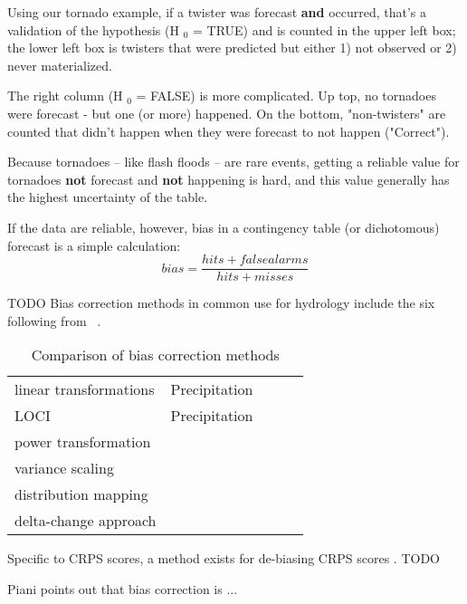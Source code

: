 Using our tornado example, if a twister was forecast \textbf{and} occurred, that's a validation of the hypothesis (H $_{\text{0}}$ = TRUE) and is counted in the upper left box; the lower left box is twisters that were predicted but either 1) not observed or 2) never materialized.

The right column (H $_{\text{0}}$ = FALSE) is more complicated. Up top, no tornadoes were forecast - but one (or more) happened. On the bottom, "non-twisters" are counted that didn't happen when they were forecast to not happen ("Correct"). 

Because tornadoes -- like flash floods -- are rare events, getting a reliable value for tornadoes \textbf{not} forecast and\textbf{ not} happening is hard, and this value generally has the highest uncertainty of the table.

If the data are reliable, however, bias in a contingency table (or dichotomous) forecast is a simple calculation:
\begin{equation}\label{BiasEquation}
bias =  \frac{ hits + false alarms }{ hits + misses }
\end{equation}


TODO
Bias correction methods in common use for hydrology include the six following from  ~\autocite{teutschbein2013bias}.

\begin{table}[ht]
\centering
\caption{Comparison of bias correction methods}
\label{tbl:compare-bias-correction}
\begin{tabular}{lllll} %
linear transformations & Precipitation &  &  &  \\
LOCI                   & Precipitation &  &  &  \\
power transformation   &               &  &  &  \\
variance scaling       &               &  &  & \\
distribution mapping   &               &  &  & \\
delta-change approach  &               &  &  & 
\end{tabular}
\end{table}


Specific to CRPS scores, a method exists for de-biasing CRPS scores \autocite{ferro2008effect}. TODO

Piani \autocite{Piani2010StatisticalEurope} points out that bias correction is ... 